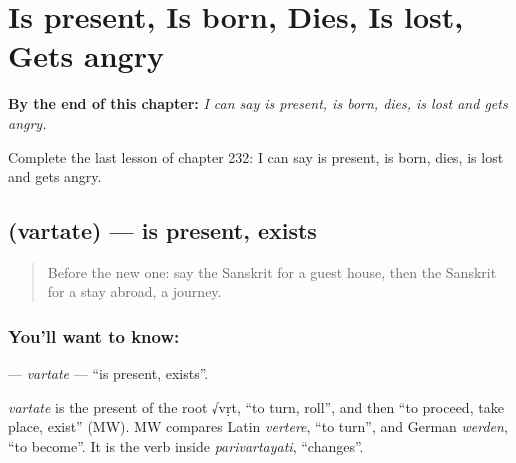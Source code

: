 
\chapter{Is present, Is born, Dies, Is lost, Gets angry}
\label{ch:sa-is-present-is-born-dies-is-lost-gets-angry}

\begin{chapteropening}
\textbf{By the end of this chapter:} \emph{I can say is present, is born, dies, is lost and gets angry.}

Complete the last lesson of chapter 232: I can say is present, is born, dies, is lost and gets angry.
\end{chapteropening}

\section[\texorpdfstring{\sk{वर्तते} (vartate)}{वर्तते (vartate)}]{ (vartate) — is present, exists}

\label{lesson:SA-C232-vartate}



\begin{quote}
Before the new one: say the Sanskrit for a guest house, then the Sanskrit for a stay abroad, a journey.
\end{quote}

\subsection*{You'll want to know: }
\textbf{} — \emph{vartate} — \textquotedblleft{}is present, exists\textquotedblright{}.

\begin{cousinweb}
\emph{vartate} is the present of the root √vṛt, \textquotedblleft{}to turn, roll\textquotedblright{}, and then \textquotedblleft{}to proceed, take place, exist\textquotedblright{} (MW). MW compares Latin \emph{vertere}, \textquotedblleft{}to turn\textquotedblright{}, and German \emph{werden}, \textquotedblleft{}to become\textquotedblright{}. It is the verb inside \emph{parivartayati}, \textquotedblleft{}changes\textquotedblright{}.
\end{cousinweb}

